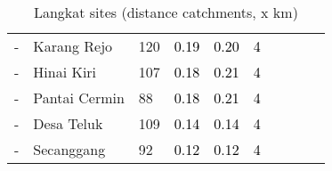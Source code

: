 \begin{table}[ht]
\begin{tabular}{C{0.05\textwidth}C{0.15\textwidth}C{0.08\textwidth}C{0.08\textwidth}C{0.08\textwidth}C{0.08\textwidth}C{0.08\textwidth}C{0.08\textwidth}C{0.08\textwidth}C{0.08\textwidth}}
  {-} & Karang Rejo & 120 & \textcolor[HTML]{000000}{0.19} & \textcolor[HTML]{000000}{0.20} & \textcolor[HTML]{000000}{4} &  &  &  &  \\ 
  {-} & Hinai Kiri & 107 & \textcolor[HTML]{000000}{0.18} & \textcolor[HTML]{000000}{0.21} & \textcolor[HTML]{000000}{4} &  &  &  &  \\ 
  {-} & Pantai Cermin &  88 & \textcolor[HTML]{000000}{0.18} & \textcolor[HTML]{000000}{0.21} & \textcolor[HTML]{000000}{4} &  &  &  &  \\ 
  {-} & Desa Teluk & 109 & \textcolor[HTML]{000000}{0.14} & \textcolor[HTML]{000000}{0.14} & \textcolor[HTML]{000000}{4} &  &  &  &  \\ 
  {-} & Secanggang &  92 & \textcolor[HTML]{000000}{0.12} & \textcolor[HTML]{000000}{0.12} & \textcolor[HTML]{000000}{4} &  &  &  &  \\ 
  \end{tabular}
\endgroup
\caption{Langkat sites (distance catchments, x km)} 
\label{tab:langkat_dist}
\end{table}
